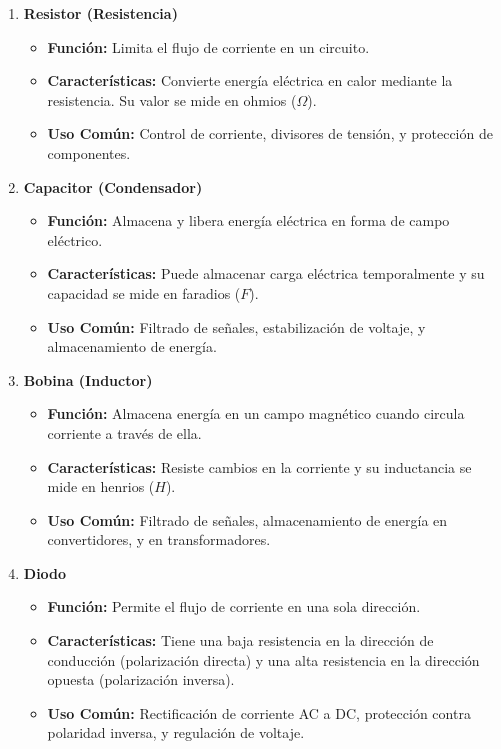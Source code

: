 \begin{enumerate}
    \item \textbf{Resistor (Resistencia)}
          \begin{itemize}
              \item \textbf{Función:} Limita el flujo de corriente en un circuito.
              \item \textbf{Características:} Convierte energía eléctrica en calor mediante la resistencia. Su valor se mide en ohmios (\(\Omega\)).
              \item \textbf{Uso Común:} Control de corriente, divisores de tensión, y protección de componentes.
          \end{itemize}

    \item \textbf{Capacitor (Condensador)}
          \begin{itemize}
              \item \textbf{Función:} Almacena y libera energía eléctrica en forma de campo eléctrico.
              \item \textbf{Características:} Puede almacenar carga eléctrica temporalmente y su capacidad se mide en faradios (\(F\)).
              \item \textbf{Uso Común:} Filtrado de señales, estabilización de voltaje, y almacenamiento de energía.
          \end{itemize}

    \item \textbf{Bobina (Inductor)}
          \begin{itemize}
              \item \textbf{Función:} Almacena energía en un campo magnético cuando circula corriente a través de ella.
              \item \textbf{Características:} Resiste cambios en la corriente y su inductancia se mide en henrios (\(H\)).
              \item \textbf{Uso Común:} Filtrado de señales, almacenamiento de energía en convertidores, y en transformadores.
          \end{itemize}

    \item \textbf{Diodo}
          \begin{itemize}
              \item \textbf{Función:} Permite el flujo de corriente en una sola dirección.
              \item \textbf{Características:} Tiene una baja resistencia en la dirección de conducción (polarización directa) y una alta resistencia en la dirección opuesta (polarización inversa).
              \item \textbf{Uso Común:} Rectificación de corriente AC a DC, protección contra polaridad inversa, y regulación de voltaje.
          \end{itemize}
\end{enumerate}